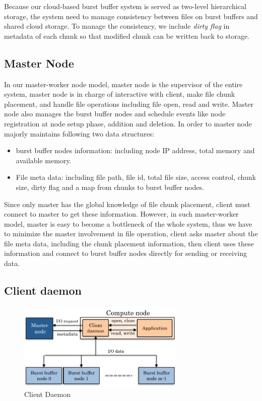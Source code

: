 Because our cloud-based burst buffer system is served as two-level hierarchical
storage, the system need to manage consistency between files on burst buffers
and shared cloud storage. 
To manage the consistency, we include \emph{dirty flag} in metadata of each
chunk so that modified chunk can be written back to storage.



\subsection{Master Node}
In our master-worker node model, master node is the supervisor of the entire system,
master node is in charge of interactive with client, make file chunk placement, and handle file operations including file open, read and write.
Master node also manages the burst buffer nodes and schedule events like node registration at node
setup phase, addition and deletion.
In order to master node majorly maintains following two data structures:
\begin{itemize}
  \item burst buffer nodes information: including node IP address, total memory and
  available memory. 
  \item File meta data: including file path, file id, total file size, access control, chunk size,
  dirty flag and a map from chunks to burst buffer nodes.
\end{itemize}

Since only master has the global knowledge of file chunk placement, client must connect to master
to get these information.
However, in such master-worker model, master is easy to become a bottleneck of the whole system,
thus we have to minimize the master involvement in file operation, client asks master about the
file meta data, including the chunk placement information, then client uses these information and
connect to burst buffer nodes directly for sending or receiving data.

\subsection{Client daemon}

\begin{figure}[tb]
	\centering
	\includegraphics[width=8cm]{img/client_daemon-2}
	\caption{Client Daemon}
	\label{implementaion:client_daemon}
\end{figure}

